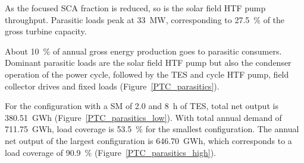
As the focused \ac{SCA} fraction is reduced, so is the solar field \ac{HTF} pump throughput. Parasitic loads peak at \SI{33}{MW}, corresponding to \SI{27.5}{\percent} of the gross turbine capacity.


About \SI{10}{\percent} of annual gross energy production goes to parasitic consumers. Dominant parasitic loads are the solar field \ac{HTF} pump but also the condenser operation of the power cycle, followed by the \ac{TES} and cycle \ac{HTF} pump, field collector drives and fixed loads (Figure~\ref{PTC_parasitics}).

For the configuration with a \ac{SM} of \num{2.0} and \SI{8}{h} of \ac{TES}, total net output is \SI{380.51}{GWh} (Figure~\ref{PTC_parasitics_low}). With total annual demand of \SI{711.75}{GWh}, load coverage is \SI{53.5}{\percent} for the smallest configuration. 
The annual net output of the largest configuration is \SI{646.70}{GWh}, which corresponds to a load coverage of \SI{90.9}{\percent} (Figure~\ref{PTC_parasitics_high}).

